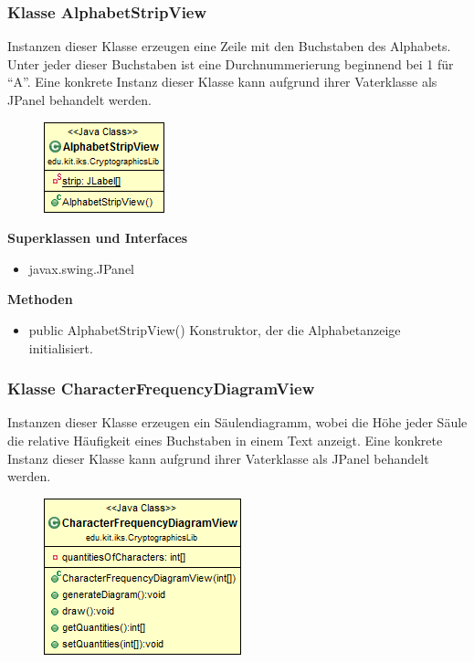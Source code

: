 \documentclass{article}
\begin{document}
	
	\subsubsection{Klasse AlphabetStripView}
	  Instanzen dieser Klasse erzeugen eine Zeile mit den Buchstaben des Alphabets.
	  Unter jeder dieser Buchstaben ist eine Durchnummerierung beginnend bei 1 für ``A''.
	  Eine konkrete Instanz dieser Klasse kann aufgrund ihrer Vaterklasse als JPanel behandelt werden.
	
      \begin{figure}[H]
        \centering
        \includegraphics{resources/edu-kit-iks-CryptographicsLib-AlphabetStripView}
      \end{figure}
	
      \textbf{Superklassen und Interfaces}
      \begin{itemize}
        \item javax.swing.JPanel
      \end{itemize}
	
      \textbf{Methoden}
      \begin{itemize}
        \item public AlphabetStripView() \newline
          Konstruktor, der die Alphabetanzeige initialisiert.
      \end{itemize}
	
	\subsubsection{Klasse CharacterFrequencyDiagramView}
	  Instanzen dieser Klasse erzeugen ein Säulendiagramm, wobei die
	  Höhe jeder Säule die relative Häufigkeit eines Buchstaben in einem Text anzeigt.
	  Eine konkrete Instanz dieser Klasse kann aufgrund ihrer Vaterklasse als JPanel behandelt werden.
	
      \begin{figure}[H]
        \centering
        \includegraphics{resources/edu-kit-iks-CryptographicsLib-CharacterFrequencyDiagramView}
      \end{figure}
	
\end{document}

